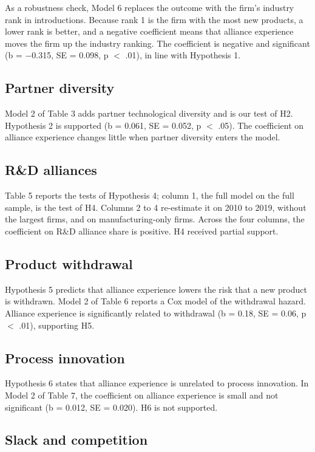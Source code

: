 \documentclass[12pt]{article}
\begin{document}
As a robustness check, Model 6 replaces the outcome with the firm's industry rank in introductions. Because rank 1 is the firm with the most new products, a lower rank is better, and a negative coefficient means that alliance experience moves the firm up the industry ranking. The coefficient is negative and significant (b = $-$0.315, SE = 0.098, p $<$ .01), in line with Hypothesis 1.

\subsection{Partner diversity}

Model 2 of Table 3 adds partner technological diversity and is our test of H2. Hypothesis 2 is supported (b = 0.061, SE = 0.052, p $<$ .05). The coefficient on alliance experience changes little when partner diversity enters the model.

\subsection{R\&D alliances}

Table 5 reports the tests of Hypothesis 4; column 1, the full model on the full sample, is the test of H4. Columns 2 to 4 re-estimate it on 2010 to 2019, without the largest firms, and on manufacturing-only firms. Across the four columns, the coefficient on R\&D alliance share is positive. H4 received partial support.

\subsection{Product withdrawal}

Hypothesis 5 predicts that alliance experience lowers the risk that a new product is withdrawn. Model 2 of Table 6 reports a Cox model of the withdrawal hazard. Alliance experience is significantly related to withdrawal (b = 0.18, SE = 0.06, p $<$ .01), supporting H5.

\subsection{Process innovation}

Hypothesis 6 states that alliance experience is unrelated to process innovation. In Model 2 of Table 7, the coefficient on alliance experience is small and not significant (b = 0.012, SE = 0.020). H6 is not supported.

\subsection{Slack and competition}
\end{document}
